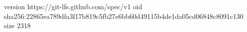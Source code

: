 version https://git-lfs.github.com/spec/v1
oid sha256:22865ea789dfa3f17b819c5fb27e6bb60d49115b4de1da05cd06848c8091c130
size 2318
